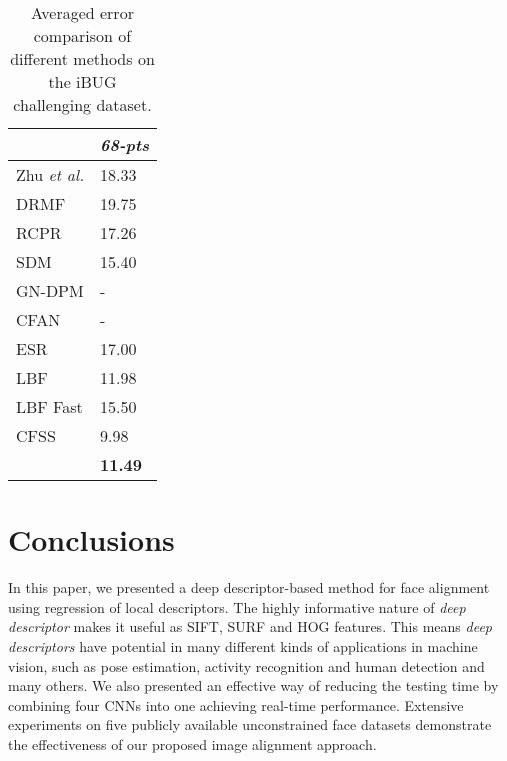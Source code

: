 \documentclass[10pt,twocolumn,letterpaper]{article}
\begin{document}
\begin{table}[thp!]
\begin{center}
\begin{tabular}{|p{7cm}|p{.9cm}|}
\hline
\centering{\it Method} &  {\it 68-pts} \\
\hline\hline
\centering Zhu \it{et al.} \cite{AFW_dataset_CVPR2012}   &18.33  \\
\centering DRMF \cite{Asthana:2013:RDR:2514950.2516059}         & 19.75    \\
\centering RCPR \cite{10.1109/ICCV.2013.191}         & 17.26  \\
\centering SDM \cite{XiongD13}          & 15.40   \\
\centering GN-DPM \cite{6909635}       &-  \\
\centering CFAN \cite{CFAN}       &-  \\
\centering ESR \cite{DBLP:journals/ijcv/CaoWWS14}               & 17.00 \\
\centering LBF \cite{DBLP:conf/cvpr/RenCW014}               & 11.98  \\
\centering LBF Fast \cite{DBLP:conf/cvpr/RenCW014}          & 15.50\\
\centering CFSS \cite{Zhu_2015_CVPR}          & 9.98\\
\hline
\centering{\bf LDDR}   &  {\bf 11.49}\\
\hline
\end{tabular}
\caption{Averaged error comparison of different methods on the iBUG  challenging dataset.} 
\label{tbl:ibug}
\end{center}
\end{table}

\section{Conclusions}\label{sec:conc}
In this paper, we presented a deep descriptor-based method for face alignment using regression of local descriptors.  
The highly informative nature of \textit{deep descriptor} makes it useful as SIFT, SURF and HOG features. This means \textit{deep descriptors} have potential in many different kinds of applications in machine vision, such as pose estimation, activity recognition and human detection and many others. We also presented an effective way of reducing the testing time by combining four CNNs into one achieving real-time performance.  Extensive experiments on five publicly available unconstrained face datasets demonstrate the effectiveness of our proposed image alignment approach.
\end{document}
